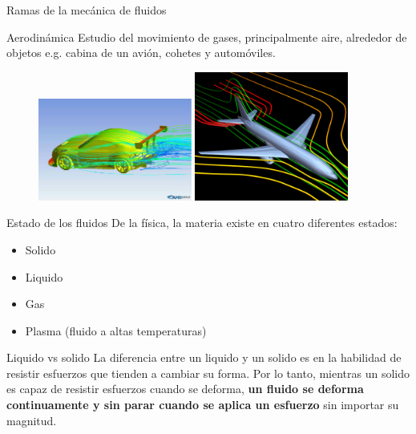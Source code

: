 \documentclass [xcolor=svgnames, t] {beamer}
\begin{document}
\begin{frame}{Ramas de la mecánica de fluidos}
\begin{block}{Aerodinámica}
Estudio del movimiento de gases, principalmente aire, alrededor de objetos e.g. cabina de un avión, cohetes y automóviles.
\end{block}
\begin{figure}
\centering
\includegraphics[width=0.45\textwidth]{aero1}
\includegraphics[width=0.45\textwidth]{aero2}
\end{figure}
\end{frame}

\begin{frame}{Estado de los fluidos}
De la física, la materia existe en cuatro diferentes estados:
\begin{itemize}
\item Solido
\item Liquido 
\item Gas
\item Plasma (fluido a altas temperaturas)
\end{itemize}
 
\begin{exampleblock}{Liquido vs solido}
La diferencia entre un liquido y un solido es en la habilidad de resistir esfuerzos que tienden a cambiar su forma. Por lo tanto, mientras un solido es capaz de resistir esfuerzos cuando se deforma, \textbf{un fluido se deforma continuamente y sin parar cuando se aplica un esfuerzo} sin importar su magnitud. 
\end{exampleblock}
\end{frame}
\end{document}
